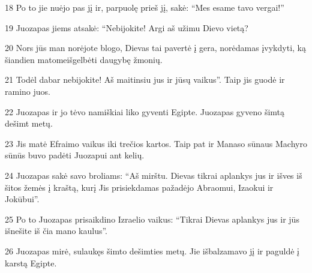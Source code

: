 \par 18 Po to jie nuėjo pas jį ir, parpuolę prieš jį, sakė: “Mes esame tavo vergai!” 
\par 19 Juozapas jiems atsakė: “Nebijokite! Argi aš užimu Dievo vietą? 
\par 20 Nors jūs man norėjote blogo, Dievas tai pavertė į gera, norėdamas įvykdyti, ką šiandien matome­išgelbėti daugybę žmonių. 
\par 21 Todėl dabar nebijokite! Aš maitinsiu jus ir jūsų vaikus”. Taip jis guodė ir ramino juos. 
\par 22 Juozapas ir jo tėvo namiškiai liko gyventi Egipte. Juozapas gyveno šimtą dešimt metų. 
\par 23 Jis matė Efraimo vaikus iki trečios kartos. Taip pat ir Manaso sūnaus Machyro sūnūs buvo padėti Juozapui ant kelių. 
\par 24 Juozapas sakė savo broliams: “Aš mirštu. Dievas tikrai aplankys jus ir išves iš šitos žemės į kraštą, kurį Jis prisiekdamas pažadėjo Abraomui, Izaokui ir Jokūbui”. 
\par 25 Po to Juozapas prisaikdino Izraelio vaikus: “Tikrai Dievas aplankys jus ir jūs išnešite iš čia mano kaulus”. 
\par 26 Juozapas mirė, sulaukęs šimto dešimties metų. Jie išbalzamavo jį ir paguldė į karstą Egipte.


